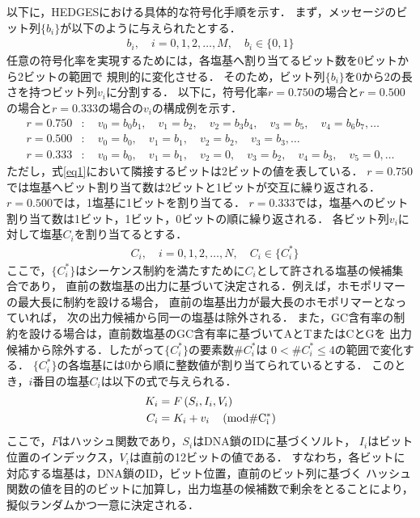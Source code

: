 \documentclass[sotsuron]{kuee}
\begin{document}
以下に，HEDGESにおける具体的な符号化手順を示す．
まず，メッセージのビット列$\{b_i\}$が以下のように与えられたとする．
\begin{align}
  b_i, \quad i=0,1,2,\ldots, M, \quad b_i \in \{0,1\}
\end{align}
任意の符号化率を実現するためには，各塩基へ割り当てるビット数を0ビットから2ビットの範囲で
規則的に変化させる．
そのため，ビット列$\{b_i\}$を0から2の長さを持つビット列$v_i$に分割する．
以下に，符号化率$r=0.750$の場合と$r=0.500$の場合と$r=0.333$の場合の$v_i$の構成例を示す．
\begin{align}
  r=0.750&: \quad v_0 = b_0b_1, \quad v_1 = b_2, \quad v_2 = b_3b_4, \quad v_3 = b_5, \quad v_4 = b_6b_7, \ldots \label{eq1} \\
  r=0.500&: \quad v_0 = b_0, \quad v_1 = b_1, \quad v_2 = b_2, \quad v_3 = b_3, \ldots \\
  r=0.333&: \quad v_0 = b_0, \quad v_1 = b_1, \quad v_2 = 0, \quad v_3 = b_2, \quad v_4 = b_3, \quad v_5 = 0, \ldots
\end{align}
ただし，式\eqref{eq1}において隣接するビットは2ビットの値を表している．
$r=0.750$では塩基へビット割り当て数は2ビットと1ビットが交互に繰り返される．
$r=0.500$では，1塩基に1ビットを割り当てる．
$r=0.333$では，塩基へのビット割り当て数は1ビット，1ビット，0ビットの順に繰り返される．
各ビット列$v_i$に対して塩基$C_i$を割り当てるとする．
\begin{align}
  &C_i, \quad i=0,1,2,\ldots ,N, \quad C_i \in \{C_i^*\}
\end{align}
ここで，$\{C_i^*\}$はシーケンス制約を満たすために$C_i$として許される塩基の候補集合であり，
直前の数塩基の出力に基づいて決定される．例えば，ホモポリマーの最大長に制約を設ける場合，
直前の塩基出力が最大長のホモポリマーとなっていれば，
次の出力候補から同一の塩基は除外される．
また，GC含有率の制約を設ける場合は，直前数塩基のGC含有率に基づいてAとTまたはCとGを
出力候補から除外する．したがって$\{C_i^*\}$の要素数$\#C_i^*$は
$0 < \#C_i^* \leq 4$の範囲で変化する．
$\{C_i^*\}$の各塩基には0から順に整数値が割り当てられているとする．
このとき，$i$番目の塩基$C_i$は以下の式で与えられる．
\begin{align}
  K_i &= F\left( S_i, I_i, V_i \right) \\
  C_i &=  K_i + v_i  \quad \left(\rm{mod} \#C_i^*\right) \label{encode}
\end{align}
ここで，$F$はハッシュ関数であり，$S_i$はDNA鎖のIDに基づくソルト，
$I_i$はビット位置のインデックス，$V_i$は直前の12ビットの値である．
すなわち，各ビットに対応する塩基は，DNA鎖のID，ビット位置，直前のビット列に基づく
ハッシュ関数の値を目的のビットに加算し，出力塩基の候補数で剰余をとることにより，
擬似ランダムかつ一意に決定される．
\end{document}
